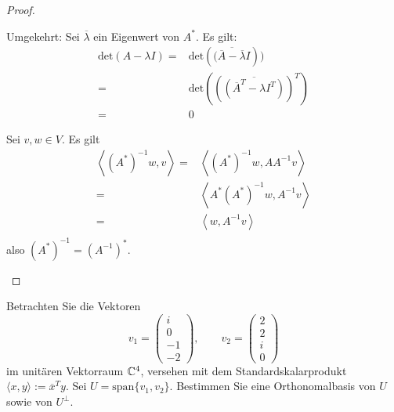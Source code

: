 \begin{proof}
\begin{parts}
Umgekehrt: Sei $\overline{\lambda}$ ein Eigenwert von $A^*$. Es gilt:
\begin{align*}
	\text{det}(A-\lambda I)=&\text{det}(\overline{(\overline{A}-\overline{\lambda}I}))\\
	=&\text{det}((\overline{(\overline{A}^T-\lambda I^T)})^T)\\
	=& 0
\end{align*}
\item Sei $v,w\in V$. Es gilt
	\begin{align*}
		\left<(A^*)^{-1}w,v \right> =& \left< (A^*)^{-1}w,A A^{-1}v \right>\\
		=&\left< A^*(A^*)^{-1}w,A^{-1}v \right>\\
		=&\left<w,A^{-1}v \right> \\
	\end{align*}
	also $(A^*)^{-1}=(A^{-1})^*$.\qedhere
\end{parts}
\end{proof}
\begin{Problem}
	Betrachten Sie die Vektoren
	\[
	v_1=\begin{pmatrix} i \\ 0 \\ -1 \\ -2 \end{pmatrix},\qquad v_2=\begin{pmatrix} 2 \\ 2 \\ i \\ 0 \end{pmatrix} 
\]
im unitären Vektorraum $\mathbb{C}^4$, versehen mit dem Standardskalarprodukt $\langle x,y\rangle:=\overline{x}^Ty$. Sei $U=\text{span}\{v_1,v_2\}$. Bestimmen Sie eine Orthonomalbasis von $U$ sowie von $U^\perp$.
\end{Problem}
